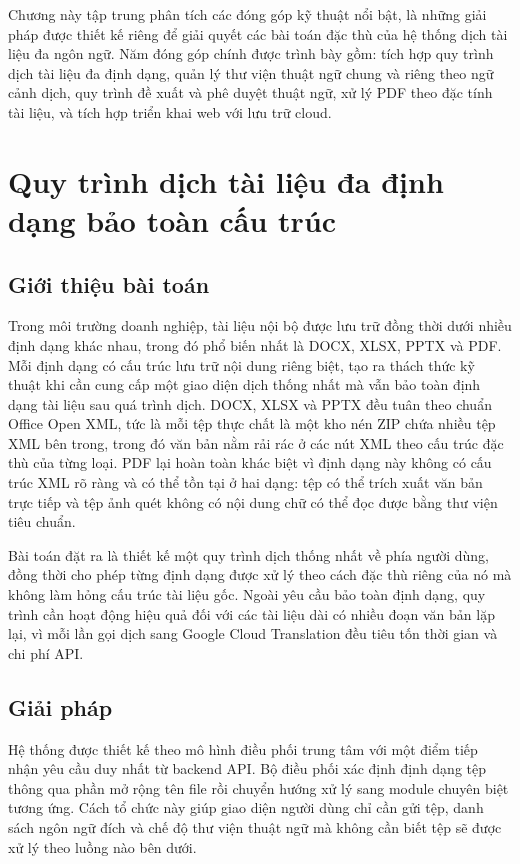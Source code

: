 \documentclass[../DoAn.tex]{subfiles}
\begin{document}
Chương này tập trung phân tích các đóng góp kỹ thuật nổi bật, là những giải pháp được thiết kế riêng để giải quyết các bài toán đặc thù của hệ thống dịch tài liệu đa ngôn ngữ. Năm đóng góp chính được trình bày gồm: tích hợp quy trình dịch tài liệu đa định dạng, quản lý thư viện thuật ngữ chung và riêng theo ngữ cảnh dịch, quy trình đề xuất và phê duyệt thuật ngữ, xử lý PDF theo đặc tính tài liệu, và tích hợp triển khai web với lưu trữ cloud.
\section{Quy trình dịch tài liệu đa định dạng bảo toàn cấu trúc}
\label{section:5.1}

\subsection{Giới thiệu bài toán}

Trong môi trường doanh nghiệp, tài liệu nội bộ được lưu trữ đồng thời dưới nhiều định dạng khác nhau, trong đó phổ biến nhất là DOCX, XLSX, PPTX và PDF. Mỗi định dạng có cấu trúc lưu trữ nội dung riêng biệt, tạo ra thách thức kỹ thuật khi cần cung cấp một giao diện dịch thống nhất mà vẫn bảo toàn định dạng tài liệu sau quá trình dịch. DOCX, XLSX và PPTX đều tuân theo chuẩn Office Open XML, tức là mỗi tệp thực chất là một kho nén ZIP chứa nhiều tệp XML bên trong, trong đó văn bản nằm rải rác ở các nút XML theo cấu trúc đặc thù của từng loại. PDF lại hoàn toàn khác biệt vì định dạng này không có cấu trúc XML rõ ràng và có thể tồn tại ở hai dạng: tệp có thể trích xuất văn bản trực tiếp và tệp ảnh quét không có nội dung chữ có thể đọc được bằng thư viện tiêu chuẩn.

Bài toán đặt ra là thiết kế một quy trình dịch thống nhất về phía người dùng, đồng thời cho phép từng định dạng được xử lý theo cách đặc thù riêng của nó mà không làm hỏng cấu trúc tài liệu gốc. Ngoài yêu cầu bảo toàn định dạng, quy trình cần hoạt động hiệu quả đối với các tài liệu dài có nhiều đoạn văn bản lặp lại, vì mỗi lần gọi dịch sang Google Cloud Translation đều tiêu tốn thời gian và chi phí API.

\subsection{Giải pháp}

Hệ thống được thiết kế theo mô hình điều phối trung tâm với một điểm tiếp nhận yêu cầu duy nhất từ backend API. Bộ điều phối xác định định dạng tệp thông qua phần mở rộng tên file rồi chuyển hướng xử lý sang module chuyên biệt tương ứng. Cách tổ chức này giúp giao diện người dùng chỉ cần gửi tệp, danh sách ngôn ngữ đích và chế độ thư viện thuật ngữ mà không cần biết tệp sẽ được xử lý theo luồng nào bên dưới.
\end{document}
